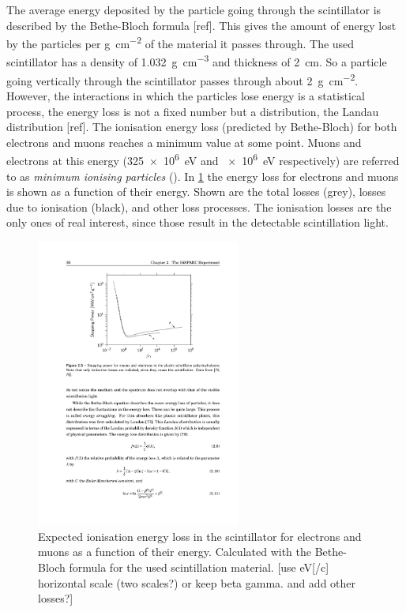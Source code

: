 The average energy deposited by the particle going through the scintillator is described by the Bethe-Bloch formula [ref]. This gives the amount of energy lost by the particles per \si{\gram\per\centi\meter\squared} of the material it passes through. The used scintillator has a density of \SI{1.032}{\gram\per\centi\meter\cubed} and thickness of \SI{2}{\centi\meter}. So a particle going vertically through the scintillator passes through about \SI{2}{\gram\per\centi\meter\squared}. However, the interactions in which the particles lose energy is a statistical process, the energy loss is not a fixed number but a distribution, the Landau distribution [ref]. The ionisation energy loss (predicted by Bethe-Bloch) for both electrons and muons reaches a minimum value at some point. Muons and electrons at this energy (\SI{325e6}{\eV} and \SI{e6}{\eV} respectively) are referred to as \textit{minimum ionising particles} (\mip). In \cref{fig:bethe-bloch} the energy loss for electrons and muons is shown as a function of their energy. Shown are the total losses (grey), losses due to ionisation (black), and other loss processes. The ionisation losses are the only ones of real interest, since those result in the detectable scintillation light.


\begin{figure}
    \centering
    \includegraphics[width=0.6\textwidth]
                    {plots/station/bethe-bloch}
    \caption{Expected ionisation energy loss in the scintillator for electrons and muons as a function of their energy. Calculated with the Bethe-Bloch formula for the used scintillation material. [use eV[/c] horizontal scale (two scales?) or keep beta gamma. and add other losses?]}
    \label{fig:bethe-bloch}
\end{figure}

